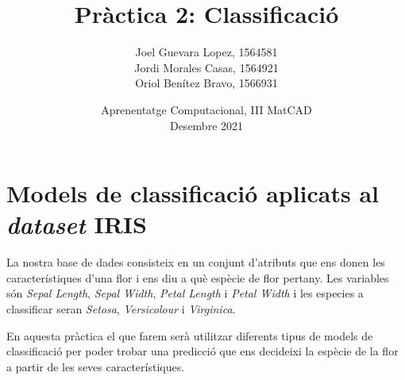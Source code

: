 \documentclass[a4paper, 11pt]{article}
\title{\Huge{\textbf{Pràctica 2: Classificació}}}
\author{\Large{Joel Guevara Lopez, 1564581}
        \\\Large{Jordi Morales Casas, 1564921}
        \\\Large{Oriol Benítez Bravo, 1566931}}
\date{Aprenentatge Computacional, III MatCAD\\ \vspace{6pt} Desembre 2021}
\begin{document}
    \maketitle

    \section{Models de classificació aplicats al \textit{dataset} IRIS}

    La nostra base de dades consisteix en un conjunt d'atributs que ens donen les característiques
    d'una flor i ens diu a què espècie de flor pertany. Les variables són \textit{Sepal Length},
    \textit{Sepal Width}, \textit{Petal Length} i \textit{Petal Width} i les especies a classificar
    seran \textit{Setosa}, \textit{Versicolour} i \textit{Virginica}.

    En aquesta pràctica el que farem serà utilitzar diferents tipus de models de classificació per
    poder trobar una predicció que ens decideixi la espècie de la flor a partir de les seves
    característiques.
\end{document}
